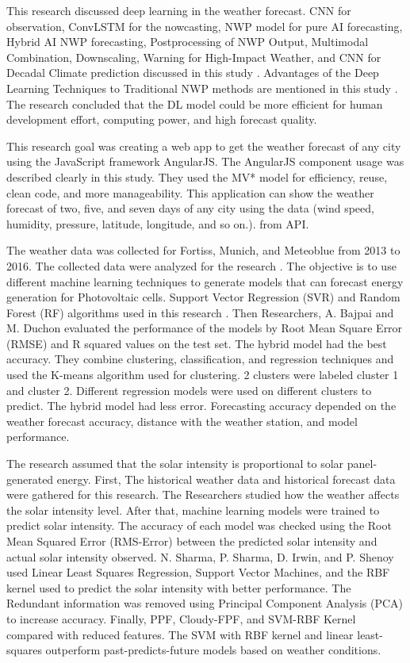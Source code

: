 \documentclass[conference]{IEEEtran}
\begin{document}
This research \cite{rs13163209} discussed deep learning in the weather forecast. CNN for observation, ConvLSTM for the nowcasting, NWP model for pure AI forecasting, Hybrid AI NWP forecasting, Postprocessing of NWP Output, Multimodal Combination, Downscaling, Warning for High-Impact Weather, and CNN for Decadal Climate prediction discussed in this study \cite{rs13163209}. Advantages of the Deep Learning Techniques to Traditional NWP methods are mentioned in this study \cite{rs13163209}. The research \cite{rs13163209}  concluded that the DL model could be more efficient for human development effort, computing power, and high forecast quality.

This research goal \cite{8448971} was creating a web app to get the weather forecast of any city using the JavaScript framework AngularJS. The AngularJS component usage was described clearly in this study. They used the MV* model for efficiency, reuse, clean code, and more manageability. This application can show the weather forecast of two, five, and seven days of any city using the data (wind speed, humidity, pressure, latitude, longitude, and so on.). from API.

The weather data was collected for Fortiss, Munich, and Meteoblue from 2013 to 2016. The collected data were analyzed for the research \cite{Hybrid}. The objective is to use different machine learning techniques to generate models that can forecast energy generation for Photovoltaic cells.  Support Vector Regression (SVR) and Random Forest (RF) algorithms used in this research \cite{Hybrid}. Then Researchers, A. Bajpai and M. Duchon \cite{Hybrid} evaluated the performance of the models by Root Mean Square Error (RMSE) and R squared values on the test set. The hybrid model had the best accuracy. They\cite{Hybrid} combine clustering, classification, and regression techniques and used the K-means algorithm used for clustering. 2 clusters were labeled cluster 1 and cluster 2. Different regression models were used on different clusters to predict. The hybrid model had less error. Forecasting accuracy depended on the weather forecast accuracy, distance with the weather station, and model performance.

The research\cite{NavinSharma} assumed that the solar intensity is proportional to solar panel-generated energy. First, The historical weather data and historical forecast data were gathered for this research\cite{NavinSharma}. The Researchers studied how the weather affects the solar intensity level. After that, machine learning models were trained to predict solar intensity. The accuracy of each model was checked using the Root Mean Squared Error (RMS-Error) between the predicted solar intensity and actual solar intensity observed. N.  Sharma,  P.  Sharma,  D.  Irwin,  and  P.  Shenoy \cite{NavinSharma} used Linear Least Squares Regression, Support Vector Machines, and the RBF kernel used to predict the solar intensity with better performance. The Redundant information was removed using Principal Component Analysis (PCA) to increase accuracy. Finally, PPF, Cloudy-FPF, and SVM-RBF Kernel compared with reduced features. The SVM with RBF kernel and linear least-squares outperform past-predicts-future models based on weather conditions.
\end{document}
